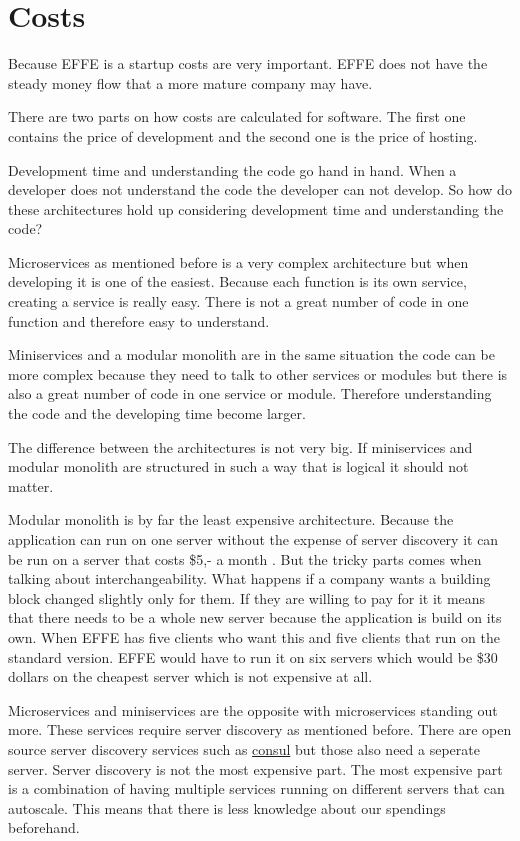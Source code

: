 \section{Costs}
\label{sec:Costs}

Because EFFE is a startup costs are very important. EFFE does not have the steady money flow that a more mature company may have.

There are two parts on how costs are calculated for software. The first one contains the price of development and the second one is the price of hosting.

Development time and understanding the code go hand in hand. When a developer does not understand the code the developer can not develop. So how do these architectures hold up considering development time and understanding the code?

Microservices as mentioned before is a very complex architecture but when developing it is one of the easiest. Because each function is its own service, creating a service is really easy. There is not a great number of code in one function and therefore easy to understand.

Miniservices and a modular monolith are in the same situation the code can be more complex because they need to talk to other services or modules but there is also a great number of code in one service or module. Therefore understanding the code and the developing time become larger.

The difference between the architectures is not very big. If miniservices and modular monolith are structured in such a way that is logical it should not matter.

Modular monolith is by far the least expensive architecture. Because the application can run on one server without the expense of server discovery it can be run on a server that costs \$5,- a month \cite{digitalOcean}. But the tricky parts comes when talking about interchangeability. What happens if a company wants a building block changed slightly only for them. If they are willing to pay for it it means that there needs to be a whole new server because the application is build on its own. When EFFE has five clients who want this and five clients that run on the standard version. EFFE would have to run it on six servers which would be \$30 dollars on the cheapest server which is not expensive at all.

Microservices and miniservices are the opposite with microservices standing out more. These services require server discovery as mentioned before. There are open source server discovery services such as \href{https://www.consul.io/}{consul} but those also need a seperate server. Server discovery is not the most expensive part. The most expensive part is a combination of having multiple services running on different servers that can autoscale. This means that there is less knowledge about our spendings beforehand.

